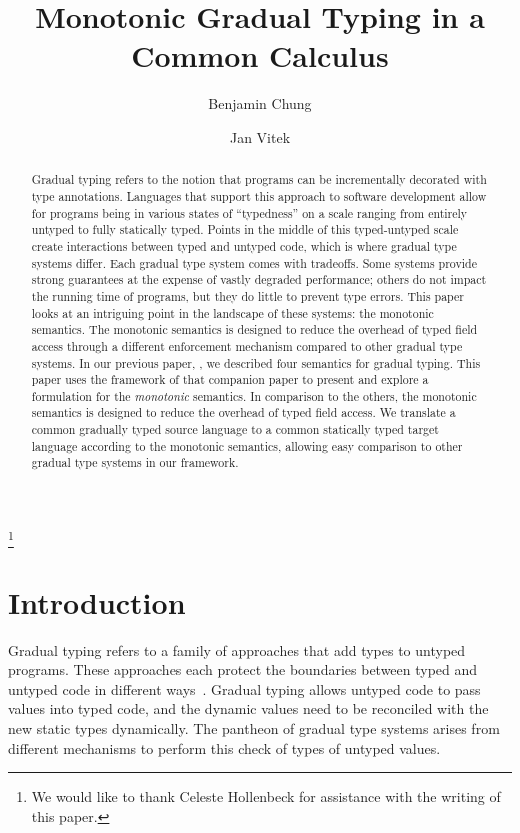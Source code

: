 \documentclass[sigconf]{acmart}
\begin{document}
\title{Monotonic Gradual Typing in a Common Calculus}
\subtitle{}

\author{Benjamin Chung}
\author{Jan Vitek}
\thanks{We would like to thank Celeste Hollenbeck for assistance with the writing of this paper.}


\begin{abstract} Gradual typing refers to the notion that programs can be
incrementally decorated with type annotations. Languages that support this
approach to software development allow for programs being in various states of
``typedness'' on a scale ranging from entirely untyped to fully statically
typed. Points in the middle of this typed-untyped scale create interactions
between typed and untyped code, which is where gradual type systems differ.
Each gradual type system comes with tradeoffs. Some systems provide strong
guarantees at the expense of vastly degraded performance; others do not impact
the running time of programs, but they do little to prevent type errors. This
paper looks at an intriguing point in the landscape of these systems: the
monotonic semantics. The monotonic semantics is designed to reduce the
overhead of typed field access through a different enforcement mechanism
compared to other gradual type systems. In our previous paper, \cite{us}, we
described four semantics for gradual typing. This paper uses the framework of
that companion paper to present and explore a formulation for the
\emph{monotonic} semantics.  In comparison to the others, the monotonic
semantics is designed to reduce the overhead of typed field access. We
translate a common gradually typed source language to a common statically
typed target language according to the monotonic semantics, allowing easy
comparison to other gradual type systems in our framework.  \end{abstract}



\maketitle

\section{Introduction}

Gradual typing refers to a family of approaches that add types to untyped
programs. These approaches each protect the boundaries between typed and untyped
code in different ways~\cite{SiekTaha06,tf-dls06}. Gradual typing allows
untyped code to pass values into typed code, and the dynamic values need to be
reconciled with the new static types dynamically. The pantheon of gradual type systems
arises from different mechanisms to perform this check of types of untyped values.
\end{document}
